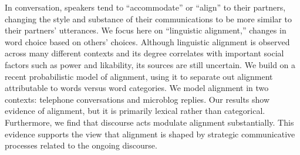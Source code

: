 In conversation, speakers tend to ``accommodate'' or ``align'' to their partners, changing the style and substance of their communications to be more similar to their partners' utterances. We focus here on ``linguistic alignment,'' changes in word choice based on others' choices. Although linguistic alignment is observed across many different contexts and its degree correlates with important social factors such as power and likability, its sources are still uncertain. We build on a recent probabilistic model of alignment, using it to separate out alignment attributable to words versus word categories. We model alignment in two contexts: telephone conversations and microblog replies. Our results show evidence of alignment, but it is primarily lexical rather than categorical. Furthermore, we find that discourse acts modulate alignment substantially. This evidence supports the view that alignment is shaped by strategic communicative processes related to the ongoing discourse.
